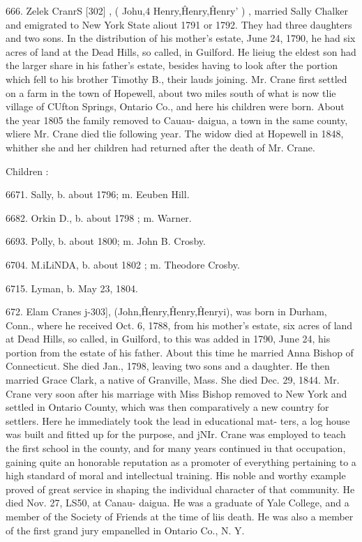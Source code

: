 666. Zelek CranrS [302] , ( Johu,4 Henry,\^ Henry,\^ Henry' ) , 
married Sally Chalker and emigrated to New York State aliout 
1791 or 1792. They had three daughters and two sons. In the 
distribution of his mother's estate, June 24, 1790, he had six 
acres of land at the Dead Hills, so called, in Guilford. He lieiug 
the eldest son had the larger share in his father's estate, besides 
having to look after the portion which fell to his brother Timothy 
B., their lauds joining. Mr. Crane first settled on a farm in the 
town of Hopewell, about two miles south of what is now tlie 
village of CUfton Springs, Ontario Co., and here his children 
were born. About the year 1805 the family removed to Cauau- 
daigua, a town in the same county, wliere Mr. Crane died tlie 
following year. The widow died at Hopewell in 1848, whither 
she and her children had returned after the death of Mr. Crane. 

Children : 

6671. Sally, b. about 1796; m. Eeuben Hill. 

6682. Orkin D., b. about 1798 ; m. Warner. 

6693. Polly, b. about 1800; m. John B. Crosby. 

6704. M.iLiNDA, b. about 1802 ; m. Theodore Crosby. 

6715. Lyman, b. May 23, 1804. 

672. Elam Cranes j-303], (John,\^ Henry,\^ Henry,\^ Henryi), 
was born in Durham, Conn., where he received Oct. 6, 1788, from 
his mother's estate, six acres of land at Dead Hills, so called, in 
Guilford, to this was added in 1790, June 24, his portion from 
the estate of his father. About this time he married Anna Bishop 
of Connecticut. She died Jan., 1798, leaving two sons and a 
daughter. He then married Grace Clark, a native of Granville, 
Mass. She died Dec. 29, 1844. Mr. Crane very soon after his 
marriage with Miss Bishop removed to New York and settled in 
Ontario County, which was then comparatively a new country for 
settlers. Here he immediately took the lead in educational mat- 
ters, a log house was built and fitted up for the purpose, and jNIr. 
Crane was employed to teach the first school in the county, and 
for many years continued iu that occupation, gaining quite an 
honorable reputation as a promoter of everything pertaining to a 
high standard of moral and intellectual training. His noble and 
worthy example proved of great service in shaping the individual 
character of that community. He died Nov. 27, LS50, at Canau- 
daigua. He was a graduate of Yale College, and a member of 
the Society of Friends at the time of liis death. He was also a 
member of the first grand jury empanelled in Ontario Co., N. Y. 

